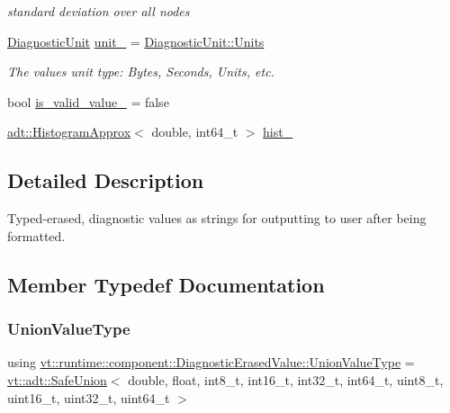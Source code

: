 \begin{DoxyCompactItemize}
\begin{DoxyCompactList}\small\item\em standard deviation over all nodes \end{DoxyCompactList}\item 
\hyperlink{namespacevt_1_1runtime_1_1component_a99ec18b08862c712176126bb7d0e307a}{Diagnostic\+Unit} \hyperlink{structvt_1_1runtime_1_1component_1_1_diagnostic_erased_value_aa43354cc162d6edaae48f878a6d874d1}{unit\+\_\+} = \hyperlink{namespacevt_1_1runtime_1_1component_a99ec18b08862c712176126bb7d0e307aae5771a362d88a71a657bfcd21ca54b3f}{Diagnostic\+Unit\+::\+Units}
\begin{DoxyCompactList}\small\item\em The value\textquotesingle{}s unit type\+: Bytes, Seconds, Units, etc. \end{DoxyCompactList}\item 
bool \hyperlink{structvt_1_1runtime_1_1component_1_1_diagnostic_erased_value_a1d9282d6e63f35b926953d6403865339}{is\+\_\+valid\+\_\+value\+\_\+} = false
\item 
\hyperlink{namespacevt_1_1adt_a486971e142bc22434d6afe695c43b599}{adt\+::\+Histogram\+Approx}$<$ double, int64\+\_\+t $>$ \hyperlink{structvt_1_1runtime_1_1component_1_1_diagnostic_erased_value_aae13ce0e05e55ba2d341d3fdcdda899c}{hist\+\_\+}
\end{DoxyCompactItemize}


\subsection{Detailed Description}
Typed-\/erased, diagnostic values as strings for outputting to user after being formatted. 

\subsection{Member Typedef Documentation}
\mbox{\label{structvt_1_1runtime_1_1component_1_1_diagnostic_erased_value_a78a7d1c1fa99338e954481ca634f5e39}} 
\subsubsection{\texorpdfstring{Union\+Value\+Type}{UnionValueType}}
{\footnotesize\ttfamily using \hyperlink{structvt_1_1runtime_1_1component_1_1_diagnostic_erased_value_a78a7d1c1fa99338e954481ca634f5e39}{vt\+::runtime\+::component\+::\+Diagnostic\+Erased\+Value\+::\+Union\+Value\+Type} =  \hyperlink{namespacevt_1_1adt_ad2a7bbcb5f4735ae9d847f96ee62f144}{vt\+::adt\+::\+Safe\+Union}$<$ double, float, int8\+\_\+t, int16\+\_\+t, int32\+\_\+t, int64\+\_\+t, uint8\+\_\+t, uint16\+\_\+t, uint32\+\_\+t, uint64\+\_\+t $>$}

